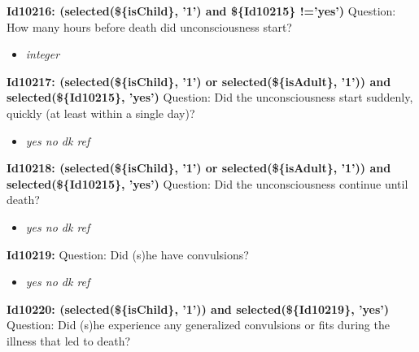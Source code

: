 \documentclass{article}%
\begin{document}
\textbf{Id10216: (selected(\$\{isChild\}, '1') and \$\{Id10215\} !='yes')\newline%
}%
Question: How many hours before death did unconsciousness start?\newline%
%
\begin{itemize}%
\item%
\textit{integer\newline%
}%
\end{itemize}%
\textbf{Id10217: (selected(\$\{isChild\}, '1') or selected(\$\{isAdult\}, '1')) and selected(\$\{Id10215\}, 'yes')\newline%
}%
Question: Did the unconsciousness start suddenly, quickly (at least within a single day)?\newline%
%
\begin{itemize}%
\item%
\textit{yes\newline%
 no\newline%
 dk\newline%
 ref\newline%
}%
\end{itemize}%
\textbf{Id10218: (selected(\$\{isChild\}, '1') or selected(\$\{isAdult\}, '1')) and selected(\$\{Id10215\}, 'yes')\newline%
}%
Question: Did the unconsciousness continue until death?\newline%
%
\begin{itemize}%
\item%
\textit{yes\newline%
 no\newline%
 dk\newline%
 ref\newline%
}%
\end{itemize}%
\textbf{Id10219: \newline%
}%
Question: Did (s)he have convulsions?\newline%
%
\begin{itemize}%
\item%
\textit{yes\newline%
 no\newline%
 dk\newline%
 ref\newline%
}%
\end{itemize}%
\textbf{Id10220: (selected(\$\{isChild\}, '1')) and selected(\$\{Id10219\}, 'yes')\newline%
}%
Question: Did (s)he experience any generalized convulsions or fits during the illness that led to death?\newline%
\end{document}
